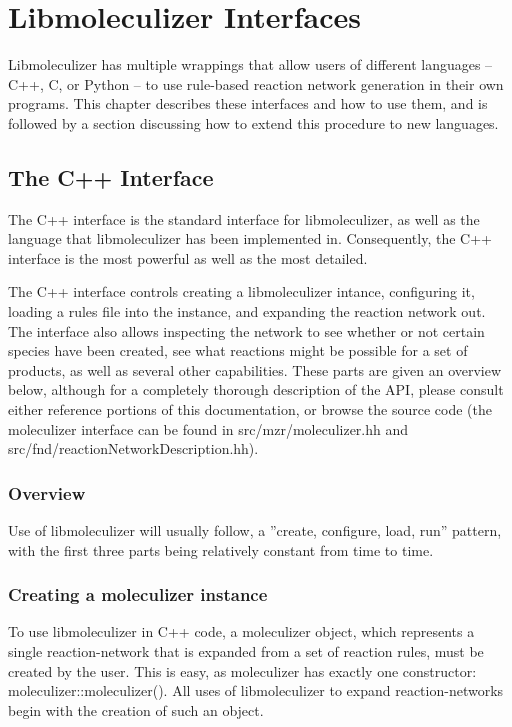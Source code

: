 \chapter{Libmoleculizer Interfaces}
\label{chap:interfacesChapter}

Libmoleculizer has multiple wrappings that allow users of different
languages -- C++, C, or Python -- to use rule-based reaction network
generation in their own programs.  This chapter describes these
interfaces and how to use them, and is followed by a section
discussing how to extend this procedure to new languages.

\section{The C++ Interface}
The C++ interface is the standard interface for libmoleculizer, as
well as the language that libmoleculizer has been implemented in.
Consequently, the C++ interface is the most powerful as well as the
most detailed. 

The C++ interface controls creating a libmoleculizer intance,
configuring it, loading a rules file into the instance, and expanding
the reaction network out.  The interface also allows inspecting the
network to see whether or not certain species have been created, see
what reactions might be possible for a set of products, as well as
several other capabilities.  These parts are given an overview below,
although for a completely thorough description of the API, please
consult either reference portions of this documentation, or browse the
source code (the moleculizer interface can be found in
src/mzr/moleculizer.hh and src/fnd/reactionNetworkDescription.hh).

\subsection{Overview}
Use of libmoleculizer will usually follow, a ''create, configure,
load, run'' pattern, with the first three parts being relatively
constant from time to time.  

\subsection{Creating a moleculizer instance}
To use libmoleculizer in C++ code, a moleculizer object, which
represents a single reaction-network that is expanded from a set of
reaction rules, must be created by the user. This is easy, as
moleculizer has exactly one constructor: moleculizer::moleculizer().
All uses of libmoleculizer to expand reaction-networks begin with the
creation of such an object.

